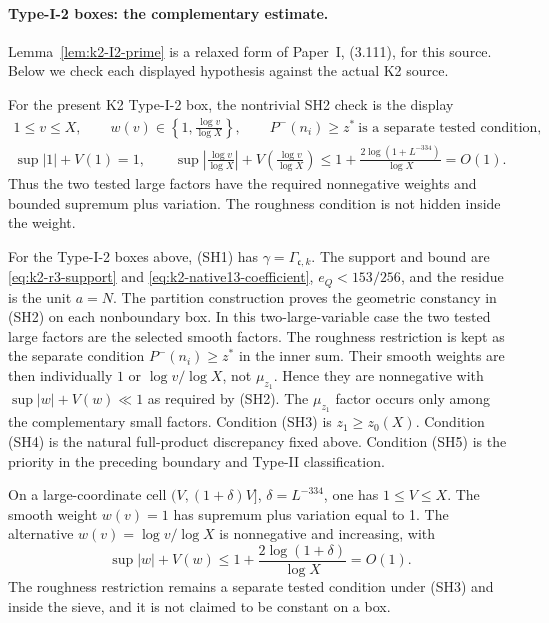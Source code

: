 \paragraph{Type-I-2 boxes: the complementary estimate.}
Lemma~\ref{lem:k2-I2-prime} is a relaxed form of Paper~I,
(3.111), for this source. Below we check each displayed hypothesis
against the actual K2 source.

For the present K2 Type-I-2 box, the nontrivial SH2 check is the
display
\begin{equation}\label{eq:k2-sh2-check}
\begin{gathered}
 1\le v\le X,
 \qquad w(v)\in\left\{1,\frac{\log v}{\log X}\right\},
 \qquad P^-(n_i)\ge z^*\ \text{is a separate tested condition},\\
 \sup|1|+V(1)=1,\qquad
 \sup\left|\frac{\log v}{\log X}\right|
   +V\!\left(\frac{\log v}{\log X}\right)
 \le 1+\frac{2\log(1+L^{-334})}{\log X}=O(1).
\end{gathered}
\end{equation}
Thus the two tested large factors have the required nonnegative weights and
bounded supremum plus variation. The roughness condition is not hidden inside
the weight.

For the Type-I-2 boxes above, (SH1) has
\(\gamma=\Gamma_{\mathfrak c,k}\). The support and bound are
\eqref{eq:k2-r3-support} and \eqref{eq:k2-native13-coefficient},
\(e_Q<153/256\), and the residue is the unit \(a=N\). The partition
construction proves the geometric constancy in (SH2) on each nonboundary
box. In this two-large-variable case the two tested large factors are the
selected smooth factors. The roughness restriction is kept as the separate
condition \(P^-(n_i)\ge z^*\) in the inner sum. Their smooth weights are then
individually \(1\) or \(\log v/\log X\), not \(\mu_{z_1}\). Hence they are
nonnegative with \(\sup|w|+V(w)\ll1\) as required by (SH2). The
\(\mu_{z_1}\) factor occurs only among the complementary small factors.
Condition (SH3) is \(z_1\ge z_0(X)\).
Condition (SH4) is the natural full-product discrepancy fixed above.
Condition (SH5) is the priority in the preceding boundary and Type-II
classification.

On a large-coordinate cell \((V,(1+\delta)V]\),
\(\delta=L^{-334}\), one has \(1\le V\le X\). The smooth weight
\(w(v)=1\) has supremum plus variation equal to 1. The alternative
\(w(v)=\log v/\log X\) is nonnegative and increasing, with
\[
 \sup |w|+V(w)
 \le 1+\frac{2\log(1+\delta)}{\log X}=O(1).
\]
The roughness restriction remains a separate tested condition under (SH3)
and inside the sieve, and it is not claimed to be constant on a box.

